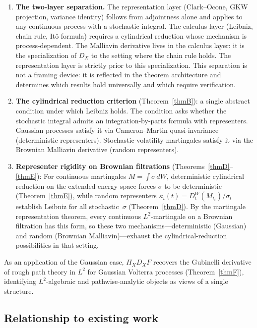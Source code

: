 \documentclass[11pt,a4paper]{article}
\theoremstyle{plain}
\theoremstyle{definition}
\theoremstyle{remark}
\begin{document}
\begin{enumerate}[label=(\roman*),leftmargin=2em]
\item \textbf{The two-layer separation.} The representation layer (Clark--Ocone, GKW projection, variance identity) follows from adjointness alone and applies to any continuous process with a stochastic integral. The calculus layer (Leibniz, chain rule, It\^o formula) requires a cylindrical reduction whose mechanism is process-dependent. The Malliavin derivative lives in the calculus layer: it is the specialization of $D_X$ to the setting where the chain rule holds. The representation layer is strictly prior to this specialization. This separation is not a framing device: it is reflected in the theorem architecture and determines which results hold universally and which require verification.

\item \textbf{The cylindrical reduction criterion} (Theorem~\ref{thmB}): a single abstract condition under which Leibniz holds. The condition asks whether the stochastic integral admits an integration-by-parts formula with representers. Gaussian processes satisfy it via Cameron--Martin quasi-invariance (deterministic representers). Stochastic-volatility martingales satisfy it via the Brownian Malliavin derivative (random representers).

\item \textbf{Representer rigidity on Brownian filtrations} (Theorems~\ref{thmD}--\ref{thmE}): For continuous martingales $M = \int\sigma\,dW$, deterministic cylindrical reduction on the extended energy space forces $\sigma$ to be deterministic (Theorem~\ref{thmE}), while random representers $\kappa_i(t) = D_t^W(M_{t_i})/\sigma_t$ establish Leibniz for all stochastic~$\sigma$ (Theorem~\ref{thmD}). By the martingale representation theorem, every continuous $L^2$-martingale on a Brownian filtration has this form, so these two mechanisms---deterministic (Gaussian) and random (Brownian Malliavin)---exhaust the cylindrical-reduction possibilities in that setting.
\end{enumerate}

As an application of the Gaussian case, $\Pi_X D_X F$ recovers the Gubinelli derivative of rough path theory in $L^2$ for Gaussian Volterra processes (Theorem~\ref{thmF}), identifying $L^2$-algebraic and pathwise-analytic objects as views of a single structure.


\subsection{Relationship to existing work}
\end{document}
